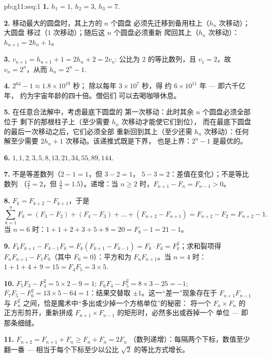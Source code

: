 \begin{solution}{pb:g11:seq:1}
\textbf{1.} $h_1 = 1$, $h_2 = 3$, $h_3 = 7$.

\textbf{2.} 移动最大的圆盘时，其上方的 $n$ 个圆盘
必须先迁移到备用柱上（$h_n$ 次移动）；大圆盘
移过（$1$ 次移动）；随后这 $n$ 个圆盘必须重新
爬回其上（$h_n$ 次移动）：$h_{n+1} = 2h_n + 1$。

\textbf{3.} $v_{n+1} = h_{n+1} + 1 = 2h_n + 2 = 2v_n$:
公比为 $2$ 的等比数列，且 $v_1 = 2$，故 $v_n = 2^n$，从而
$h_n = 2^n - 1$.

\textbf{4.} $2^{64} - 1 \approx 1.8 \times 10^{19}$ 秒；
除以每年 $3 \times 10^7$ 秒，得
约 $6 \times 10^{11}$ 年 --- 即六千亿年，
约为宇宙年龄的四十倍。僧侣们
可以去喝咖啡休息。

\textbf{5.} 在任意合法解中，考虑最底下圆盘的
第一次移动：此时其余 $n$ 个圆盘必须全部位于
剩下的那根柱子上（至少需要 $h_n$ 次移动才能使它们到位），
而在最底下圆盘的最后一次移动之后，它们必须全部
重新回到其上（至少还需 $h_n$ 次移动）：任何解至少需要
$2h_n + 1$ 次移动。该递推式既是下界，
也是上界：$2^n - 1$ 是最优的。

\textbf{6.} $1, 1, 2, 3, 5, 8, 13, 21, 34, 55, 89, 144$.

\textbf{7.} 不是等差数列（$2 - 1 = 1$，但 $3 - 2 = 1$，
$5 - 3 = 2$：差值在变化）；不是等比数列
（$\frac21 = 2$，但 $\frac32 = 1.5$）。递增：当
$n \geq 2$ 时，$F_{n+1} - F_n = F_{n-1} > 0$。

\textbf{8.} $F_k = F_{k+2} - F_{k+1}$，于是
\[
\sum_{k=1}^{n} F_k = (F_3 - F_2) + (F_4 - F_3) + \dots +
(F_{n+2} - F_{n+1}) = F_{n+2} - F_2 = F_{n+2} - 1 .
\]
当 $n = 6$ 时：$1 + 1 + 2 + 3 + 5 + 8 = 20 = F_8 - 1 = 21 - 1$。

\textbf{9.} $F_k F_{k+1} - F_{k-1} F_k = F_k (F_{k+1} -
F_{k-1}) = F_k \cdot F_k = F_k^2$；求和裂项得
$F_n F_{n+1} - F_1 F_0$（其中 $F_0 = 0$）：平方和为
$F_n F_{n+1}$。当 $n = 4$ 时：$1 + 1 + 4 + 9 = 15 = F_4 F_5 =
3 \times 5$.

\textbf{10.} $F_5 F_3 - F_4^2 = 5 \times 2 - 9 = 1$;
$F_6 F_4 - F_5^2 = 8 \times 3 - 25 = -1$;
$F_7 F_5 - F_6^2 = 13 \times 5 - 64 = 1$：结果交替取
$\pm 1$。这一“差一”现象存在于 $F_{n+1} F_{n-1}$ 与
$F_n^2$ 之间，恰是魔术中“多出或少掉一个方格单位”的秘密：
将一个 $F_n \times F_n$ 的正方形剪开，重新拼成
$F_{n+1} \times F_{n-1}$ 的矩形时，必然多出或吞掉一个
单位 --- 即那条细缝。

\textbf{11.} $F_{n+2} = F_{n+1} + F_n \geq F_n + F_n = 2F_n$
（数列递增）：每隔两个下标，数值至少
翻一番 --- 相当于每个下标至少以公比 $\sqrt2$
的等比方式增长。


\end{solution}
